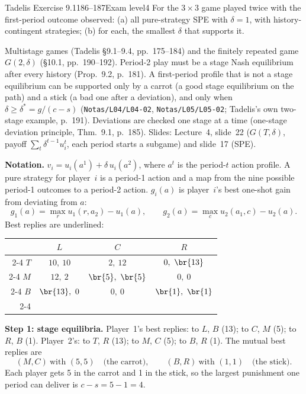 \begin{exsol}{Tadelis Exercise 9.1}{186--187}{Exam level}{4}
\asked For the $3\times3$ game played twice with the first-period outcome observed: (a) all
pure-strategy SPE with $\delta = 1$, with history-contingent strategies; (b) for each, the smallest
$\delta$ that supports it.

\method Multistage games (Tadelis \S9.1--9.4, pp.~175--184) and the finitely repeated game
$G(2,\delta)$ (\S10.1, pp.~190--192). Period-2 play must be a stage Nash equilibrium after every
history (Prop.~9.2, p.~181). A first-period profile that is not a stage equilibrium can be
supported only by a carrot (a good stage equilibrium on the path) and a stick (a bad one after a
deviation), and only when $\delta \ge \delta^* = g/(c - s)$ (\texttt{Notas/L04/L04-02},
\texttt{Notas/L05/L05-02}; Tadelis's own two-stage example, p.~191). Deviations are checked one
stage at a time (one-stage deviation principle, Thm.~9.1, p.~185). Slides: Lecture~4, slide~22
($G(T,\delta)$, payoff $\sum_t \delta^{t-1}u_i^t$, each period starts a subgame) and slide~17 (SPE).

\solution
\textbf{Notation.} $v_i = u_i(a^1) + \delta\, u_i(a^2)$, where $a^t$ is the period-$t$ action
profile. A pure strategy for player~$i$ is a period-1 action and a map from the nine possible
period-1 outcomes to a period-2 action. $g_i(a)$ is player~$i$'s best one-shot gain from deviating
from $a$:
\[
  g_1(a) = \max_{r} u_1(r, a_2) - u_1(a), \qquad g_2(a) = \max_{c} u_2(a_1, c) - u_2(a).
\]
Best replies are underlined:
\begin{center}
\begin{tabular}{r|c|c|c|}
\multicolumn{1}{r}{} & \multicolumn{1}{c}{$L$} & \multicolumn{1}{c}{$C$} & \multicolumn{1}{c}{$R$}\\ \cline{2-4}
$T$ & $10,\ 10$ & $2,\ 12$ & $0,\ \br{13}$ \\ \cline{2-4}
$M$ & $12,\ 2$ & $\br{5},\ \br{5}$ & $0,\ 0$ \\ \cline{2-4}
$B$ & $\br{13},\ 0$ & $0,\ 0$ & $\br{1},\ \br{1}$ \\ \cline{2-4}
\end{tabular}
\end{center}

\textbf{Step 1: stage equilibria.} Player~1's best replies: to $L$, $B$ (13); to $C$, $M$ (5); to
$R$, $B$ (1). Player~2's: to $T$, $R$ (13); to $M$, $C$ (5); to $B$, $R$ (1). The mutual best
replies are
\[
  (M, C)\ \text{with } (5,5) \quad\text{(the carrot)}, \qquad (B, R)\ \text{with } (1,1)
  \quad\text{(the stick)} .
\]
Each player gets 5 in the carrot and 1 in the stick, so the largest punishment one period can
deliver is $c - s = 5 - 1 = 4$.


\end{exsol}
